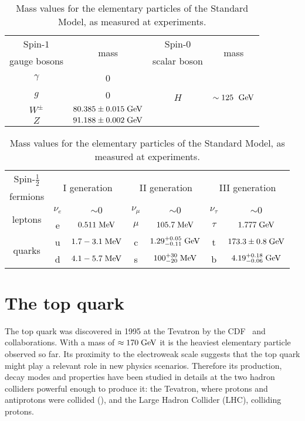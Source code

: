 \begin{table}\centering
  \begin{tabular}{cccc}\toprule
    Spin-$1$ & \multirow{2}{*}{mass} & Spin-0 & \multirow{2}{*}{mass}\\
    gauge bosons & & scalar boson & \\\midrule
    $\gamma$      & 0  & \multirow{4}{*}{$H$} & \multirow{4}{*}{$\sim 125~\; \mathrm{GeV}$}                        \\
    $g$           & 0  & &                        \\
    $W^{\pm}$ & $ 80.385 \pm 0.015 \; \mathrm{GeV}$ & &\\
    $Z$       & $ 91.188 \pm 0.002 \; \mathrm{GeV}$ & &\\\bottomrule
  \end{tabular}
  \begin{tabular}{ccccccc}\toprule
    Spin-$\tfrac{1}{2}$ &  \multicolumn{2}{c}{\multirow{2}{*}{I generation}}
    &  \multicolumn{2}{c}{\multirow{2}{*}{II generation}}
    &  \multicolumn{2}{c}{\multirow{2}{*}{III generation}}\\
    fermions & & & & & \\\midrule
    \multirow{2}{*}{leptons} &
    $\nu_{e}$   & \small{$\sim 0$} &  
    $\nu_{\mu}$ & \small{$\sim 0$} &  
    $\nu_{\tau}$ & \small{$\sim 0$} \\
    &
    e            & \small{$0.511\; \mathrm{MeV}$}   &  
    $\mu$ & \small{$105.7\; \mathrm{MeV}$} &  
    $\tau$     & \small{$1.777\; \mathrm{GeV}$} \\
    \multirow{2}{*}{quarks} &
    u & \small{$1.7-3.1\; \mathrm{MeV}$}         &  
    c & \small{$1.29^{+0.05}_{-0.11}\; \mathrm{GeV}$}  &  
    t & \small{$173.3\pm0.8\; \mathrm{GeV}$}\\
    &
    d & \small{$4.1-5.7\; \mathrm{MeV}$} &  
    s & \small{$100^{+30}_{-20}\; \mathrm{MeV}$} &  
    b & \small{$4.19^{+0.18}_{-0.06}\; \mathrm{GeV}$} \\\bottomrule
  \end{tabular}
  \caption{Mass values for the elementary particles of the Standard
    Model, as measured at experiments.\label{tab:smmasses}}
\end{table}
 
\section{The top quark}
\label{sec:topquark}

The top quark was discovered in 1995 at the Tevatron by the
CDF~\cite{topcdf} and \dzero{}~\cite{topdzero} collaborations. With a
mass of $\approx{}170\; \mathrm{GeV}{}$ it is the heaviest elementary particle
observed so far. Its proximity to the electroweak scale suggests that
the top quark might play a relevant role in new physics
scenarios. Therefore its production, decay modes and properties have
been studied in details at the two hadron colliders powerful 
enough to produce it: the Tevatron, where protons and antiprotons were
collided (\ppbar{}), and the Large Hadron Collider (LHC), colliding protons.

